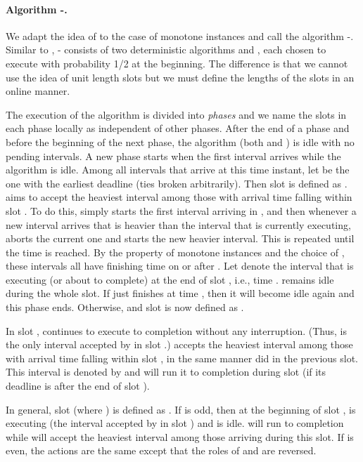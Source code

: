\documentclass[11pt]{article}
\begin{document}
\paragraph{Algorithm -.} 
We adapt the idea of  to the case of 
monotone instances and call the algorithm -.
Similar to , - consists of two deterministic algorithms  
and , each chosen to execute with probability 1/2 at the beginning.
The difference is that we cannot use the idea of unit length slots
but we must define the lengths of the slots in an online manner.

The execution of the algorithm is divided into {\em phases}
and we name the slots in each phase locally as 
independent of other phases.
After the end of a phase and before the beginning of the next phase,
the algorithm (both  and ) is idle with no pending intervals.
A new phase starts when the first interval arrives while the algorithm is 
idle.
Among all intervals that arrive at this time instant, 
let  be the one with the earliest deadline (ties broken arbitrarily).
Then slot  is defined as .
 aims to accept the heaviest interval
among those with arrival time falling within slot .
To do this,  simply starts the first interval arriving in , and
then whenever a new interval arrives that is heavier than the
interval that  is currently executing,
 aborts the current one and starts the new heavier interval.
This is repeated until the time  is reached.
By the property of monotone instances and 
the choice of ,
these intervals all have finishing time on or after .  
Let  denote the interval that  is executing (or about to complete)
at the end of slot , i.e., time .  
 remains idle during the whole slot.
If  just finishes  at time , then it will become idle again
and this phase ends.  
Otherwise,  and 
slot  is now defined as .

In slot ,  continues to execute  to completion without any 
interruption.
(Thus,  is the only interval accepted by  in slot .)
 accepts the heaviest interval among 
those with arrival time falling within slot , in the same manner 
did in the previous slot.
This interval is denoted by  and  will
run it to completion during slot 
(if its deadline is after the end of slot ).

In general, slot  (where )
is defined as .  
If  is odd, then at the beginning of slot ,
 is executing  (the interval accepted by  in slot ) 
and  is idle.
 will run  to completion while
 will accept the heaviest interval among those arriving
during this slot.
If  is even, the actions are the same except that
the roles of  and  are reversed.
\end{document}
